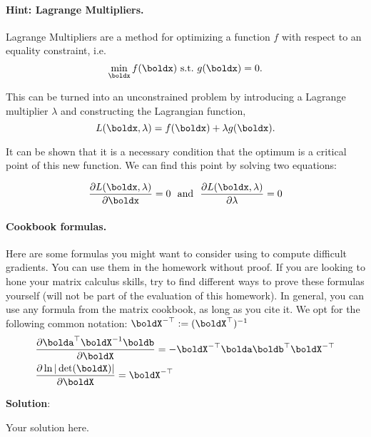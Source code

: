 \documentclass[submit]{../harvardml}
\newenvironment{solution}{
    \vspace{2mm}
    \color{blue}\noindent\textbf{Solution}:
}{}
\begin{document}
\begin{problem}
\paragraph{Hint: Lagrange Multipliers.} Lagrange Multipliers are a method for
optimizing a function $f$ with respect to an
equality constraint, i.e.
\[\min_{\boldx} f(\boldx)\ \text{s.t.}\ g(\boldx) = 0.\]

This can be turned into an unconstrained problem by introducing a
Lagrange multiplier $\lambda$ and constructing the Lagrangian function,
\[L(\boldx, \lambda) =  f(\boldx) + \lambda g(\boldx).\]

It can be shown that it is a necessary condition that the optimum
is a critical point of this new function. We can find this point by solving two equations:

\[\frac{\partial L(\boldx, \lambda)}{\partial  \boldx} = 0  \ \ \text{and}\  \  \frac{\partial L(\boldx, \lambda)}{\partial \lambda} = 0 \]


\paragraph{Cookbook formulas.} Here are some formulas you might want to consider
using to compute difficult gradients. You can use them  in the homework
without proof. If you are looking to hone your matrix calculus skills, try to
find different ways to prove these formulas yourself (will not be part of the
evaluation of this homework). In general, you can use any formula from the matrix cookbook,
as long as you cite it. We opt for the following common notation:
$\boldX^{-\top} := (\boldX^{\top})^{-1}$
\begin{align*}
   & \frac{\partial \bolda^\top \boldX^{-1} \boldb}{\partial \boldX} = - \boldX^{-\top} \bolda \boldb^\top \boldX^{-\top} \\
   & \frac{\partial \ln | \det (\boldX) |}{\partial \boldX} = \boldX^{-\top}
\end{align*}
\end{problem}

\newpage

\begin{solution}
	Your solution here.
\end{solution}
\end{document}
